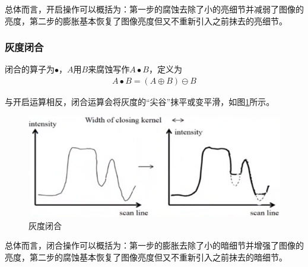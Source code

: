 \documentclass[UTF8]{ctexart}
\begin{document}
                    \indent 总体而言，开启操作可以概括为：第一步的腐蚀去除了小的亮细节并减弱了图像的亮度，第二步的膨胀基本恢复了图像亮度但又不重新引入之前抹去的亮细节。
                                        
                \subsubsection{灰度闭合}
                
                    \indent 闭合的算子为$\bullet$，$A$用$B$来腐蚀写作$A \bullet B$，定义为
                        \begin{align}
                            A \bullet B = \left( A \oplus B \right) \ominus B 
                        \end{align}           
                
                    \indent 与开启运算相反，闭合运算会将灰度的“尖谷”抹平或变平滑，如图\ref{grey_closing}所示。
                    
                			\begin{figure}[H]
                				\centering 
                				\includegraphics[scale=0.3]{grey_closing.png} 
                				\caption{灰度闭合} 
                				\label{grey_closing}
                			\end{figure}                    
                            
                    \indent 总体而言，闭合操作可以概括为：第一步的膨胀去除了小的暗细节并增强了图像的亮度，第二步的腐蚀基本恢复了图像亮度但又不重新引入之前抹去的暗细节。
                                                      
%    
\end{document}
